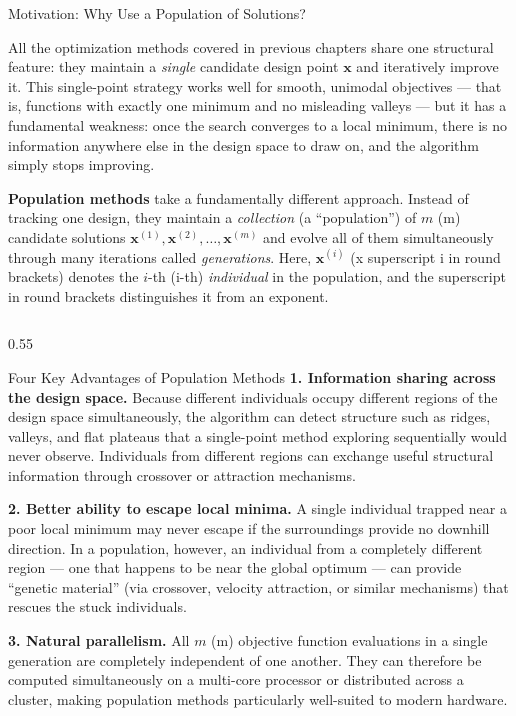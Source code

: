 \documentclass[aspectratio=169,10pt]{beamer}
\newcommand{\bx}{\mathbf{x}}
\begin{document}
\begin{frame}[allowframebreaks]{Motivation: Why Use a Population of Solutions?}

  All the optimization methods covered in previous chapters share one
  structural feature: they maintain a \emph{single} candidate design
  point $\bx$ and iteratively improve it.  This single-point strategy
  works well for smooth, unimodal objectives --- that is, functions with
  exactly one minimum and no misleading valleys --- but it has a
  fundamental weakness: once the search converges to a local minimum,
  there is no information anywhere else in the design space to draw on,
  and the algorithm simply stops improving.

  \textbf{Population methods} take a fundamentally different approach.
  Instead of tracking one design, they maintain a \emph{collection}
  (a ``population'') of $m$ (m) candidate solutions
  $\bx^{(1)}, \bx^{(2)}, \ldots, \bx^{(m)}$ and evolve all of them
  simultaneously through many iterations called \emph{generations}.
  Here, $\bx^{(i)}$ (x superscript i in round brackets) denotes the
  $i$-th (i-th) \emph{individual} in the population, and the superscript
  in round brackets distinguishes it from an exponent.

  \begin{columns}[T]
    \begin{column}{0.55\textwidth}
      \begin{block}{Four Key Advantages of Population Methods}
        \textbf{1. Information sharing across the design space.}
        Because different individuals occupy different regions of the
        design space simultaneously, the algorithm can detect structure
        such as ridges, valleys, and flat plateaus that a single-point
        method exploring sequentially would never observe.  Individuals
        from different regions can exchange useful structural information
        through crossover or attraction mechanisms.

        \textbf{2. Better ability to escape local minima.}
        A single individual trapped near a poor local minimum may never
        escape if the surroundings provide no downhill direction.  In
        a population, however, an individual from a completely different
        region --- one that happens to be near the global optimum ---
        can provide ``genetic material'' (via crossover, velocity
        attraction, or similar mechanisms) that rescues the stuck
        individuals.

        \textbf{3. Natural parallelism.}
        All $m$ (m) objective function evaluations in a single
        generation are completely independent of one another.  They
        can therefore be computed simultaneously on a multi-core
        processor or distributed across a cluster, making population
        methods particularly well-suited to modern hardware.


\end{block}
\end{column}
\end{columns}
\end{frame}
\end{document}
